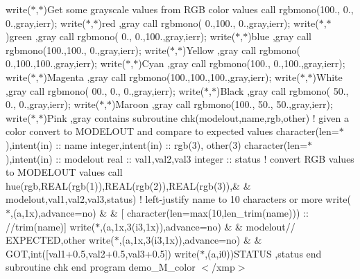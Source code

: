 \begin{DoxyDescription}
write($\ast$,$\ast$)\textquotesingle{}Get some grayscale values from R\+GB color values\textquotesingle{} call rgbmono(100., 0., 0.,gray,ierr); write($\ast$,$\ast$)\textquotesingle{}red \textquotesingle{},gray call rgbmono( 0.,100., 0.,gray,ierr); write($\ast$,$\ast$)\textquotesingle{}green \textquotesingle{},gray call rgbmono( 0., 0.,100.,gray,ierr); write($\ast$,$\ast$)\textquotesingle{}blue \textquotesingle{},gray call rgbmono(100.,100., 0.,gray,ierr); write($\ast$,$\ast$)\textquotesingle{}Yellow \textquotesingle{},gray call rgbmono( 0.,100.,100.,gray,ierr); write($\ast$,$\ast$)\textquotesingle{}Cyan \textquotesingle{},gray call rgbmono(100., 0.,100.,gray,ierr); write($\ast$,$\ast$)\textquotesingle{}Magenta \textquotesingle{},gray call rgbmono(100.,100.,100.,gray,ierr); write($\ast$,$\ast$)\textquotesingle{}White \textquotesingle{},gray call rgbmono( 00., 0., 0.,gray,ierr); write($\ast$,$\ast$)\textquotesingle{}Black \textquotesingle{},gray call rgbmono( 50., 0., 0.,gray,ierr); write($\ast$,$\ast$)\textquotesingle{}Maroon \textquotesingle{},gray call rgbmono(100., 50., 50.,gray,ierr); write($\ast$,$\ast$)\textquotesingle{}Pink \textquotesingle{},gray contains subroutine chk(modelout,name,rgb,other) ! given a color convert to M\+O\+D\+E\+L\+O\+UT and compare to expected values character(len=$\ast$),intent(in) \+:\+: name integer,intent(in) \+:\+: rgb(3), other(3) character(len=$\ast$),intent(in) \+:\+: modelout real \+:\+: val1,val2,val3 integer \+:\+: status ! convert R\+GB values to M\+O\+D\+E\+L\+O\+UT values call hue(\textquotesingle{}rgb\textquotesingle{},R\+E\+A\+L(rgb(1)),R\+E\+A\+L(rgb(2)),R\+E\+A\+L(rgb(3)),\& \& modelout,val1,val2,val3,status) ! left-\/justify name to 10 characters or more write($\ast$,\textquotesingle{}(a,1x)\textquotesingle{},advance=\textquotesingle{}no\textquotesingle{}) \& \& \mbox{[} character(len=max(10,len\+\_\+trim(name))) \+:\+:\textquotesingle{} \textquotesingle{}//trim(name)\mbox{]} write($\ast$,\textquotesingle{}(a,1x,3(i3,1x))\textquotesingle{},advance=\textquotesingle{}no\textquotesingle{}) \& \& modelout//\textquotesingle{} E\+X\+P\+E\+C\+T\+ED\textquotesingle{},other write($\ast$,\textquotesingle{}(a,1x,3(i3,1x))\textquotesingle{},advance=\textquotesingle{}no\textquotesingle{}) \& \& \textquotesingle{}G\+OT\textquotesingle{},int(\mbox{[}val1+0.5,val2+0.5,val3+0.5\mbox{]}) write($\ast$,\textquotesingle{}(a,i0)\textquotesingle{})\textquotesingle{}S\+T\+A\+T\+US \textquotesingle{},status end subroutine chk end program demo\+\_\+\+M\+\_\+color $<$/xmp$>$ 



\end{DoxyDescription}
